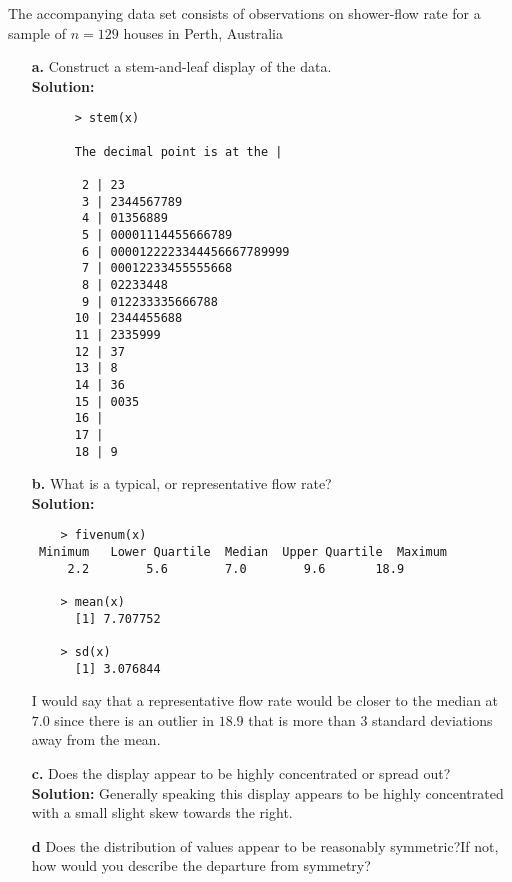 \documentclass[12pt]{article}
\makeatletter
\theoremstyle{homework}
\newenvironment{exercise}[1]
{\def\@currentlabel{#1}\exercisecore}
{\endexercisecore}
\makeatother
\begin{document}
\begin{exercise}{1.14} The accompanying data set consists of observations on shower-flow rate for a sample of $n = 129$ houses in Perth, Australia
  \begin{enumerate}
    \item[\textbf{a.}] Construct a stem-and-leaf display of the data.\\
    \textbf{Solution:}
    \begin{lstlisting}
      > stem(x)

      The decimal point is at the |
    
       2 | 23
       3 | 2344567789
       4 | 01356889
       5 | 00001114455666789
       6 | 0000122223344456667789999
       7 | 00012233455555668
       8 | 02233448
       9 | 012233335666788
      10 | 2344455688
      11 | 2335999
      12 | 37
      13 | 8
      14 | 36
      15 | 0035
      16 | 
      17 | 
      18 | 9    
    \end{lstlisting}

    \vspace{.5in}
     
    \item[\textbf{b.}] What is a typical, or representative flow rate?\\
    \textbf{Solution:}
    
    \begin{lstlisting}
    > fivenum(x)
 Minimum   Lower Quartile  Median  Upper Quartile  Maximum 
     2.2        5.6        7.0        9.6       18.9 
      
    > mean(x)
      [1] 7.707752
  
    > sd(x)
      [1] 3.076844
    \end{lstlisting}
    I would say that a representative flow rate would be closer to the median at $7.0$ since there is an outlier in $18.9$ that is more than 3 standard deviations away from the mean.
    \vspace{.5in}
     
    \item[\textbf{c.}] Does the display appear to be highly concentrated or spread out?\\
    
    \textbf{Solution:} Generally speaking this display appears to be highly concentrated with a small slight skew towards the right.
    \vspace{.5in}
     

    \item[\textbf{d}] Does the distribution of values appear to be reasonably symmetric?If not, how would you describe the departure from symmetry?\\
    

\end{enumerate}
\end{exercise}
\end{document}
